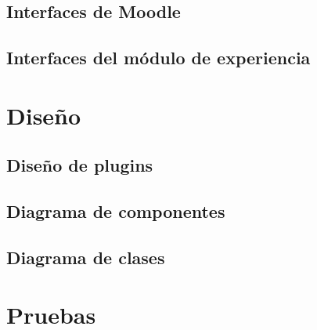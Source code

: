 \clearpage
\section{Interfaces de Moodle}




\section{Interfaces del módulo de experiencia}


\chapter{Diseño}
\section{Diseño de plugins}
\section{Diagrama de componentes}
\section{Diagrama de clases}

\chapter{Pruebas}

